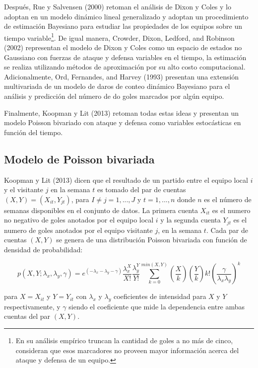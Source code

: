 Después, Rue y Salvensen (2000) \cite{rue2000prediction} retoman el análisis de Dixon y Coles \cite{dixon1997modelling} y lo adoptan en un modelo dinámico lineal generalizado y adoptan un procedimiento de estimación Bayesiano para estudiar las propiedades de los equipos sobre un tiempo variable\footnote{En su análisis empírico truncan la cantidad de goles a no más de cinco, consideran que esos marcadores no proveen mayor información acerca del ataque y defensa de un equipo.}. De igual manera, Crowder, Dixon, Ledford, and Robinson (2002) \cite{crowder2002dynamic} representan el modelo de Dixon y Coles \cite{dixon1997modelling} como un espacio de estados no Gaussiano con fuerzas de ataque y defensa variables en el tiempo, la estimación se realiza utilizando métodos de aproximación por su alto costo computacional. Adicionalmente, Ord, Fernandes, and Harvey (1993) \cite{ord1993time} presentan una extensión multivariada de un modelo de daros de conteo dinámico Bayesiano para el análisis y predicción del número de do goles marcados por algún equipo.

Finalmente, Koopman y Lit (2013) \cite{koopman2013dynamic} retoman todas estas ideas y presentan un modelo Poisson bivariado con ataque y defensa como variables estocásticas en función del tiempo. 
\subsection{Modelo de Poisson bivariada}
\label{subsec:bivariate-poisson}

Koopman y Lit (2013) \cite{koopman2013dynamic} dicen que el resultado de un partido entre el equipo local $i$ y el visitante $j$ en la semana $t$ es tomado del par de cuentas $(X,Y) = (X_{it},Y_{jt})$, para $I\neq j = 1, ...,J$ y $t=1,...,n$ donde $n$ es el número de semanas disponibles en el conjunto de datos. La primera cuenta $X_{it}$ es el numero no negativo de goles anotados por el equipo local $i$ y la segunda cuenta $Y_{jt}$ es el numero de goles anotados por el equipo visitante $j$, en la semana $t$. Cada par de cuentas $(X,Y)$ se genera de una distribución Poisson bivariada con función de densidad de probabilidad:
 
\[p(X,Y;\lambda_x,\lambda_y,\gamma) = e^{(-\lambda_x-\lambda_y-\gamma)}\frac{\lambda^X_x}{X!}\frac{\lambda^Y_y}{Y!}\sum_{k=0}^{min(X,Y)}\left(\frac{X}{k}\right)\left(\frac{Y}{k}\right)k!\left(\frac{\gamma}{\lambda_x\lambda_y}\right)^k \]

para $X = X_{it}$ y $Y = Y_{it}$ con $\lambda_x$ y $\lambda_y$ coeficientes de intensidad para $X$ y $Y$ respectivamente, y $\gamma$ siendo el coeficiente que mide la dependencia entre ambas cuentas del par $(X,Y)$. 

